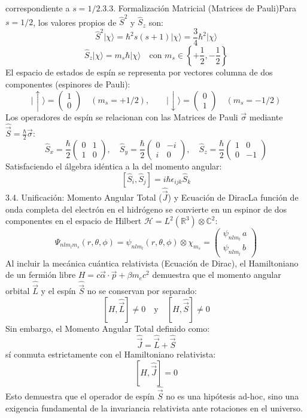 \documentclass{article}
\begin{document}
correspondiente a $s = 1/2$.3.3. Formalización Matricial (Matrices de Pauli)Para $s = 1/2$, los valores propios de $\hat{S}^2$ y $\hat{S}_z$ son:$$\hat{S}^2 \vert{}\chi\rangle = \hbar^2 s(s+1) \vert{}\chi\rangle = \frac{3}{4}\hbar^2 \vert{}\chi\rangle$$$$\hat{S}_z \vert{}\chi\rangle = m_s \hbar \vert{}\chi\rangle \quad \text{con } m_s \in \left\{+\frac{1}{2}, -\frac{1}{2}\right\}$$El espacio de estados de espín se representa por vectores columna de dos componentes (espinores de Pauli):$$\vert{}\uparrow\rangle = \begin{pmatrix} 1 \\ 0 \end{pmatrix} \quad (m_s = +1/2), \qquad \vert{}\downarrow\rangle = \begin{pmatrix} 0 \\ 1 \end{pmatrix} \quad (m_s = -1/2)$$Los operadores de espín se relacionan con las Matrices de Pauli $\vec{\sigma}$ mediante $\hat{\vec{S}} = \frac{\hbar}{2} \vec{\sigma}$:$$\hat{S}_x = \frac{\hbar}{2} \begin{pmatrix} 0 & 1 \\ 1 & 0 \end{pmatrix}, \quad \hat{S}_y = \frac{\hbar}{2} \begin{pmatrix} 0 & -i \\ i & 0 \end{pmatrix}, \quad \hat{S}_z = \frac{\hbar}{2} \begin{pmatrix} 1 & 0 \\ 0 & -1 \end{pmatrix}$$Satisfaciendo el álgebra idéntica a la del momento angular:$$[\hat{S}_i, \hat{S}_j] = i\hbar \epsilon_{ijk} \hat{S}_k$$3.4. Unificación: Momento Angular Total ($\hat{\vec{J}}$) y Ecuación de DiracLa función de onda completa del electrón en el hidrógeno se convierte en un espinor de dos componentes en el espacio de Hilbert $\mathcal{H} = L^2(\mathbb{R}^3) \otimes \mathbb{C}^2$:$$\Psi_{n l m_l m_s}(r,\theta,\phi) = \psi_{nlm_l}(r,\theta,\phi) \otimes \chi_{m_s} = \begin{pmatrix} \psi_{nlm_l} \, a \\ \psi_{nlm_l} \, b \end{pmatrix}$$Al incluir la mecánica cuántica relativista (Ecuación de Dirac), el Hamiltoniano de un fermión libre $H = c \vec{\alpha} \cdot \vec{p} + \beta m_e c^2$ demuestra que el momento angular orbital $\hat{\vec{L}}$ y el espín $\hat{\vec{S}}$ no se conservan por separado:$$[H, \hat{\vec{L}}] \neq 0 \quad \text{y} \quad [H, \hat{\vec{S}}] \neq 0$$Sin embargo, el Momento Angular Total definido como:$$\hat{\vec{J}} = \hat{\vec{L}} + \hat{\vec{S}}$$sí conmuta estrictamente con el Hamiltoniano relativista:$$[H, \hat{\vec{J}}] = 0$$Esto demuestra que el operador de espín $\hat{\vec{S}}$ no es una hipótesis ad-hoc, sino una exigencia fundamental de la invariancia relativista ante rotaciones en el universo.
\end{document}
